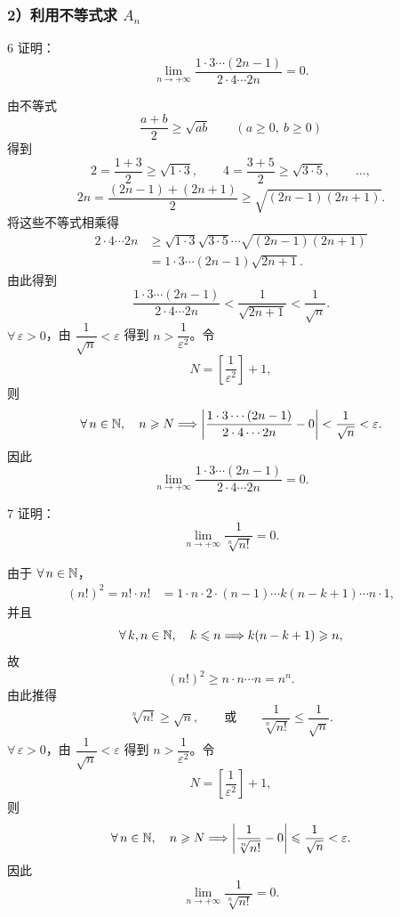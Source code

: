 \subsubsection*{\texorpdfstring{2）利用不等式求 \(A_n\)}{2）利用不等式求 An}}

\begin{sourceexample}{6}
证明：
\[
\lim_{n\to+\infty}
\frac{1\cdot3\cdots(2n-1)}{2\cdot4\cdots2n}=0.
\]

由不等式
\[
\frac{a+b}{2}\geqslant\sqrt{ab}\qquad(a\geqslant0,\ b\geqslant0)
\]
得到
\[
2=\frac{1+3}{2}\geqslant\sqrt{1\cdot3},\qquad
4=\frac{3+5}{2}\geqslant\sqrt{3\cdot5},\qquad\ldots,
\]
\[
2n=\frac{(2n-1)+(2n+1)}2\geqslant\sqrt{(2n-1)(2n+1)}.
\]
将这些不等式相乘得
\[
\begin{aligned}
2\cdot4\cdots2n
&\geqslant
\sqrt{1\cdot3}\sqrt{3\cdot5}\cdots\sqrt{(2n-1)(2n+1)}\\
&=1\cdot3\cdots(2n-1)\sqrt{2n+1}.
\end{aligned}
\]
由此得到
\[
\frac{1\cdot3\cdots(2n-1)}{2\cdot4\cdots2n}
<\frac1{\sqrt{2n+1}}<\frac1{\sqrt n}.
\]
\(\forall\,\varepsilon>0\)，由 \(\dfrac1{\sqrt n}<\varepsilon\) 得到
\(n>\dfrac1{\varepsilon^2}\)。令
\[
N=\left[\frac1{\varepsilon^2}\right]+1,
\]
则
\[
\forall\,n\in\mathbb{N},\quad n\geqslant N
\Longrightarrow
\left|
\frac{1\cdot3\cdots(2n-1)}{2\cdot4\cdots2n}-0
\right|
<\frac1{\sqrt n}<\varepsilon.
\]
因此
\[
\lim_{n\to+\infty}
\frac{1\cdot3\cdots(2n-1)}{2\cdot4\cdots2n}=0.
\]
\end{sourceexample}

\begin{sourceexample}{7}
证明：
\[
\lim_{n\to+\infty}\frac1{\sqrt[n]{n!}}=0.
\]

由于 \(\forall\,n\in\mathbb{N}\)，
\[
\begin{aligned}
(n!)^2=n!\cdot n!
&=1\cdot n\cdot2\cdot(n-1)\cdots k(n-k+1)\cdots n\cdot1,
\end{aligned}
\]
并且
\[
\forall\,k,n\in\mathbb{N},\quad k\leqslant n
\Longrightarrow k(n-k+1)\geqslant n,
\]
故
\[
(n!)^2\geqslant n\cdot n\cdots n=n^n.
\]
由此推得
\[
\sqrt[n]{n!}\geqslant\sqrt n,
\qquad\text{或}\qquad
\frac1{\sqrt[n]{n!}}\leqslant\frac1{\sqrt n}.
\]
\(\forall\,\varepsilon>0\)，由 \(\dfrac1{\sqrt n}<\varepsilon\) 得到
\(n>\dfrac1{\varepsilon^2}\)。令
\[
N=\left[\frac1{\varepsilon^2}\right]+1,
\]
则
\[
\forall\,n\in\mathbb{N},\quad n\geqslant N
\Longrightarrow
\left|\frac1{\sqrt[n]{n!}}-0\right|
\leqslant\frac1{\sqrt n}<\varepsilon.
\]
因此
\[
\lim_{n\to+\infty}\frac1{\sqrt[n]{n!}}=0.
\]
\end{sourceexample}

